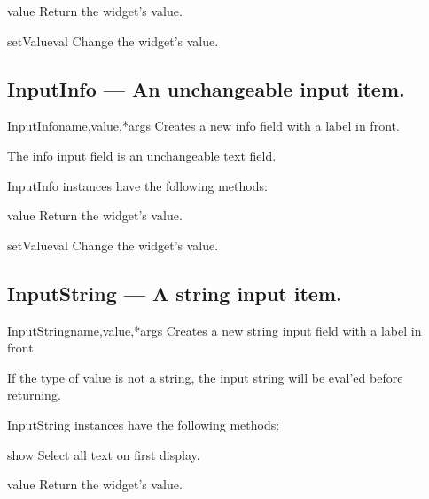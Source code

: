 \begin{funcdesc}{value}{}
Return the widget's value.
\end{funcdesc}

\begin{funcdesc}{setValue}{val}
Change the widget's value.
\end{funcdesc}

\subsection{InputInfo --- An unchangeable input item.}


\begin{classdesc}{InputInfo}{name,value,*args}
Creates a new info field with a label in front.

        The info input field is an unchangeable text field.
        
\end{classdesc}

InputInfo instances have the following methods:

\begin{funcdesc}{value}{}
Return the widget's value.
\end{funcdesc}

\begin{funcdesc}{setValue}{val}
Change the widget's value.
\end{funcdesc}

\subsection{InputString --- A string input item.}


\begin{classdesc}{InputString}{name,value,*args}
Creates a new string input field with a label in front.

        If the type of value is not a string, the input string
        will be eval'ed before returning.
        
\end{classdesc}

InputString instances have the following methods:

\begin{funcdesc}{show}{}
Select all text on first display.
\end{funcdesc}

\begin{funcdesc}{value}{}
Return the widget's value.
\end{funcdesc}

